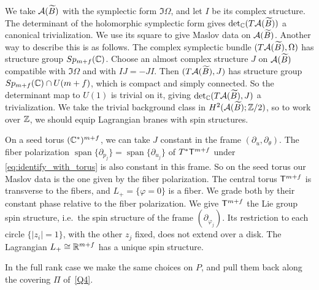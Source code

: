 \documentclass[12pt, letter]{amsart}
\theoremstyle{definition}
\begin{document}
We take $\mathcal{A}(\widetilde B)$ with the symplectic form $\Im\Omega$, and let $I$ be its complex structure.
The determinant of the holomorphic symplectic form gives $\det_{\mathbb{C}}(T\mathcal{A}(\widetilde B))$ a canonical trivialization.
We use its square to give Maslov data on $\mathcal{A}(\widetilde B)$.
Another way to describe this is as follows. 
The complex symplectic bundle $(T\mathcal{A}(\widetilde B),\Omega)$ has structure group $Sp_{m+f}(\mathbb{C})$.
Choose an almost complex structure $J$ on $\mathcal{A}(\widetilde B)$ compatible with $\Im\Omega$ and with $IJ=-JI$.
Then $(T\mathcal{A}(\widetilde B),J)$ has structure group $Sp_{m+f}(\mathbb{C})\cap U(m+f)$, which is compact and simply connected.
So the determinant map to $U(1)$ is trivial on it, giving $\det_{\mathbb{C}}(T\mathcal{A}(\widetilde B),J)$ a trivialization.
We take the trivial background class in $H^2(\mathcal{A}(\widetilde B);\mathbb{Z}/2)$, so to work over $\mathbb{Z}$, we should equip
Lagrangian branes with spin structures.

On a seed torus $(\mathbb{C}^*)^{m+f}$, we can take $J$ constant in the frame $(\partial_u,\partial_\theta)$.
The fiber polarization $\operatorname{span}\{\partial_{p_j}\}=\operatorname{span}\{\partial_{u_j}\}$ of $T^*\mathsf T^{m+f}$ under \eqref{eq:identify_with_torus} is also constant in this frame.
So on the seed torus our Maslov data is the one given by the fiber polarization.
The central torus $\mathsf T^{m+f}$ is transverse to the fibers, and $L_+=\{\varphi=0\}$ is a fiber.
We grade both by their constant phase relative to the fiber polarization.
We give $\mathsf T^{m+f}$ the Lie group spin structure, i.e.\ the spin structure of the frame $(\partial_{\varphi_j})$.
Its restriction to each circle $\{|z_i|=1\}$, with the other $z_j$ fixed, does not extend over a disk.
The Lagrangian $L_+\cong\mathbb{R}^{m+f}$ has a unique spin structure.

In the full rank case we make the same choices on $P$, and pull them back along the covering $\Pi$ of~\ref{Q4}.
\end{document}
